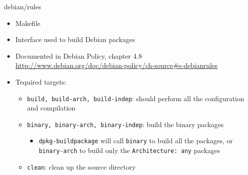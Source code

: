 \documentclass[10pt,final]{beamer}
\begin{document}
\begin{frame}[fragile]{debian/rules}
  \hbr
  \begin{itemize}
  \item Makefile
    \br
  \item Interface used to build Debian packages
    \br
  \item Documented in Debian Policy, chapter 4.8\\
    {\small \url{http://www.debian.org/doc/debian-policy/ch-source\#s-debianrules}}
    \br
  \item Tequired targets:
    \begin{itemize}
    \item \texttt{build, build-arch, build-indep}: should perform all the configuration and compilation
      \hbr
    \item \texttt{binary, binary-arch, binary-indep}: build the binary packages
      \begin{itemize}
      \item \texttt{dpkg-buildpackage} will call \texttt{binary} to build all
        the packages, or \texttt{binary-arch} to build only the
        \texttt{Architecture:~any} packages
      \end{itemize}
      \hbr
    \item \texttt{clean}: clean up the source directory
    \end{itemize}
  \end{itemize}
\end{frame}
\end{document}
